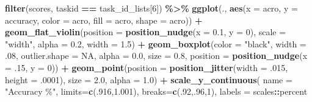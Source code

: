 \documentclass[
]{book}
\newenvironment{Shaded}{\begin{snugshade}}{\end{snugshade}}
\newcommand{\AttributeTok}[1]{\textcolor[rgb]{0.13,0.29,0.53}{#1}}
\newcommand{\ConstantTok}[1]{\textcolor[rgb]{0.56,0.35,0.01}{#1}}
\newcommand{\DecValTok}[1]{\textcolor[rgb]{0.00,0.00,0.81}{#1}}
\newcommand{\FloatTok}[1]{\textcolor[rgb]{0.00,0.00,0.81}{#1}}
\newcommand{\FunctionTok}[1]{\textcolor[rgb]{0.13,0.29,0.53}{\textbf{#1}}}
\newcommand{\NormalTok}[1]{#1}
\newcommand{\SpecialCharTok}[1]{\textcolor[rgb]{0.81,0.36,0.00}{\textbf{#1}}}
\newcommand{\StringTok}[1]{\textcolor[rgb]{0.31,0.60,0.02}{#1}}
\begin{document}
\begin{Shaded}
\begin{Highlighting}[]
\FunctionTok{filter}\NormalTok{(scores, taskid }\SpecialCharTok{==}\NormalTok{ task\_id\_lists[}\DecValTok{6}\NormalTok{]) }\SpecialCharTok{\%\textgreater{}\%}
  \FunctionTok{ggplot}\NormalTok{(., }\FunctionTok{aes}\NormalTok{(}\AttributeTok{x =}\NormalTok{ acro, }\AttributeTok{y =}\NormalTok{ accuracy, }\AttributeTok{color =}\NormalTok{ acro,}
                \AttributeTok{fill =}\NormalTok{ acro, }\AttributeTok{shape =}\NormalTok{ acro)) }\SpecialCharTok{+}
  \FunctionTok{geom\_flat\_violin}\NormalTok{(}\AttributeTok{position =} \FunctionTok{position\_nudge}\NormalTok{(}\AttributeTok{x =} \FloatTok{0.1}\NormalTok{, }\AttributeTok{y =} \DecValTok{0}\NormalTok{),}
                   \AttributeTok{scale =} \StringTok{"width"}\NormalTok{, }\AttributeTok{alpha =} \FloatTok{0.2}\NormalTok{, }\AttributeTok{width =} \FloatTok{1.5}\NormalTok{) }\SpecialCharTok{+}
  \FunctionTok{geom\_boxplot}\NormalTok{(}\AttributeTok{color =} \StringTok{"black"}\NormalTok{, }\AttributeTok{width =}\NormalTok{ .}\DecValTok{08}\NormalTok{, }\AttributeTok{outlier.shape =} \ConstantTok{NA}\NormalTok{, }\AttributeTok{alpha =} \FloatTok{0.0}\NormalTok{,}
               \AttributeTok{size =} \FloatTok{0.8}\NormalTok{, }\AttributeTok{position =} \FunctionTok{position\_nudge}\NormalTok{(}\AttributeTok{x =}\NormalTok{ .}\DecValTok{15}\NormalTok{, }\AttributeTok{y =} \DecValTok{0}\NormalTok{)) }\SpecialCharTok{+}
  \FunctionTok{geom\_point}\NormalTok{(}\AttributeTok{position =} \FunctionTok{position\_jitter}\NormalTok{(}\AttributeTok{width =}\NormalTok{ .}\DecValTok{015}\NormalTok{, }\AttributeTok{height =}\NormalTok{ .}\DecValTok{0001}\NormalTok{),}
             \AttributeTok{size =} \FloatTok{2.0}\NormalTok{, }\AttributeTok{alpha =} \FloatTok{1.0}\NormalTok{) }\SpecialCharTok{+}
  \FunctionTok{scale\_y\_continuous}\NormalTok{(}
    \AttributeTok{name =} \StringTok{"Accuracy \%"}\NormalTok{,}
    \AttributeTok{limits=}\FunctionTok{c}\NormalTok{(.}\DecValTok{916}\NormalTok{,}\FloatTok{1.001}\NormalTok{),}
    \AttributeTok{breaks=}\FunctionTok{c}\NormalTok{(.}\DecValTok{92}\NormalTok{,.}\DecValTok{96}\NormalTok{,}\DecValTok{1}\NormalTok{),}
    \AttributeTok{labels =}\NormalTok{ scales}\SpecialCharTok{::}\NormalTok{percent}


\end{Highlighting}
\end{Shaded}
\end{document}
